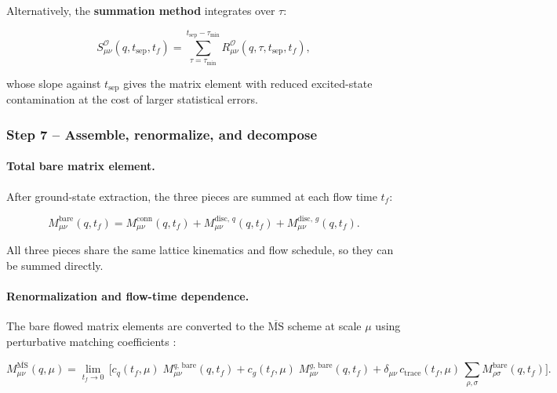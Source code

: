 \documentclass[11pt,a4paper]{article}
\begin{document}
Alternatively, the \textbf{summation method} integrates over $\tau$:

\begin{equation}\label{eq:summation}
  S_{\mu\nu}^{\mathcal{O}}(q, t_{\text{sep}}, t_f)
    = \sum_{\tau = \tau_{\text{min}}}^{t_{\text{sep}} - \tau_{\text{min}}}
      R_{\mu\nu}^{\mathcal{O}}(q, \tau, t_{\text{sep}}, t_f),
\end{equation}

whose slope against $t_{\text{sep}}$ gives the matrix element with reduced excited-state
contamination at the cost of larger statistical errors.

\subsubsection{Step 7 -- Assemble, renormalize, and decompose}
\label{sec:analysis_step7}

\paragraph{Total bare matrix element.}
After ground-state extraction, the three pieces are summed at each flow time $t_f$:

\begin{equation}\label{eq:M_total_bare}
  M_{\mu\nu}^{\text{bare}}(q, t_f)
    = M_{\mu\nu}^{\text{conn}}(q, t_f)
    + M_{\mu\nu}^{\text{disc},\,q}(q, t_f)
    + M_{\mu\nu}^{\text{disc},\,g}(q, t_f).
\end{equation}

All three pieces share the same lattice kinematics and flow schedule, so they can be
summed directly.

\paragraph{Renormalization and flow-time dependence.}
The bare flowed matrix elements are converted to the $\overline{\text{MS}}$ scheme at scale $\mu$
using perturbative matching coefficients \cite{Suzuki:2013, Makino:2016}:

\begin{equation}\label{eq:renorm_full}
  M_{\mu\nu}^{\overline{\text{MS}}}(q, \mu)
    = \lim_{t_f \to 0}\,
      \Big[ c_q(t_f, \mu)\; M_{\mu\nu}^{q,\,\text{bare}}(q, t_f)
         + c_g(t_f, \mu)\; M_{\mu\nu}^{g,\,\text{bare}}(q, t_f)
         + \delta_{\mu\nu}\, c_{\text{trace}}(t_f, \mu)\,
           \sum_{\rho,\sigma} M_{\rho\sigma}^{\text{bare}}(q, t_f)
      \Big].
\end{equation}
\end{document}
